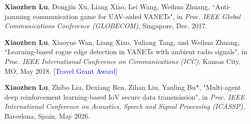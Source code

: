 \documentclass{article}
\begin{document}
\begin{justifying}
\begin{myreferences}
	\item \textbf{Xiaozhen Lu}, Dongjin Xu, Liang Xiao, Lei Wang, Weihua Zhuang, ``Anti-jamming communication game for UAV-aided VANETs", in \emph{Proc. IEEE Global Communications Conference (GLOBECOM)}, Singapore, Dec. 2017.
	\item \textbf{Xiaozhen Lu}, Xiaoyue Wan, Liang Xiao, Yuliang Tang, and Weihua Zhuang, ``Learning-based rogue edge detection in VANETs with ambient radio signals", in \emph{Proc. IEEE International Conference on Communications (ICC)}, Kansas City, MO, May 2018. [\textcolor{blue}{Travel Grant Award}]
	\item \textbf{Xiaozhen Lu}, Zhibo Liu, Dexiang Ren, Zihan Liu, Yanling Bu*, "Multi-agent deep reinforcement learning-based IoV secure data transmission", in \emph{Proc. IEEE International Conference on Acoustics, Speech and Signal Processing (ICASSP)}, Barcelona, Spain, May 2026.
	

\end{myreferences}
\end{justifying}
\end{document}
